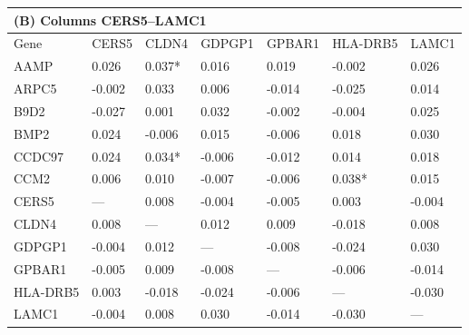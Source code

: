 \begin{table}[htbp]
\begin{tabular}{lllllll}
\toprule
\multicolumn{7}{l}{\textbf{(B)} Columns CERS5--LAMC1}\\
\midrule
  Gene & CERS5 & CLDN4 & GDPGP1 & GPBAR1 & HLA-DRB5 & LAMC1 \\
\midrule
  AAMP     & 0.026  & 0.037* & 0.016  & 0.019  & -0.002 & 0.026 \\
  ARPC5    & -0.002 & 0.033  & 0.006  & -0.014 & -0.025 & 0.014 \\
  B9D2     & -0.027 & 0.001  & 0.032  & -0.002 & -0.004 & 0.025 \\
  BMP2     & 0.024  & -0.006 & 0.015  & -0.006 & 0.018  & 0.030 \\
  CCDC97   & 0.024  & 0.034* & -0.006 & -0.012 & 0.014  & 0.018 \\
  CCM2     & 0.006  & 0.010  & -0.007 & -0.006 & 0.038* & 0.015 \\
  CERS5    & ---    & 0.008  & -0.004 & -0.005 & 0.003  & -0.004 \\
  CLDN4    & 0.008  & ---    & 0.012  & 0.009  & -0.018 & 0.008 \\
  GDPGP1   & -0.004 & 0.012  & ---    & -0.008 & -0.024 & 0.030 \\
  GPBAR1   & -0.005 & 0.009  & -0.008 & ---    & -0.006 & -0.014 \\
  HLA-DRB5 & 0.003  & -0.018 & -0.024 & -0.006 & ---    & -0.030 \\
  LAMC1    & -0.004 & 0.008  & 0.030  & -0.014 & -0.030 & --- \\
\bottomrule
\end{tabular}

\end{table}
